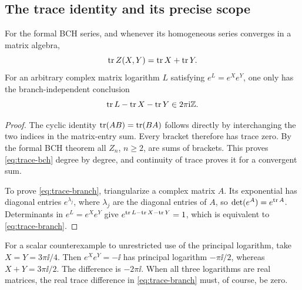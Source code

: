 \subsection{The trace identity and its precise scope}
\begin{proposition}\label{prop:trace}
For the formal BCH series, and whenever its homogeneous series converges in a matrix algebra,
\begin{equation}\label{eq:trace-bch}
 \operatorname{tr} Z(X,Y)=\operatorname{tr} X+\operatorname{tr} Y.
\end{equation}
For an arbitrary complex matrix logarithm $L$ satisfying $e^L=e^Xe^Y$, one only has the branch-independent conclusion
\begin{equation}\label{eq:trace-branch}
 \operatorname{tr} L-\operatorname{tr} X-\operatorname{tr} Y\in2\pi\mathrm i\mathbb Z.
\end{equation}
\end{proposition}
\begin{proof}
The cyclic identity $\operatorname{tr}(AB)=\operatorname{tr}(BA)$ follows directly by interchanging the two indices in the matrix-entry sum. Every bracket therefore has trace zero. By the formal BCH theorem all $Z_n$, $n\geq2$, are sums of brackets. This proves \cref{eq:trace-bch} degree by degree, and continuity of trace proves it for a convergent sum.

To prove \cref{eq:trace-branch}, triangularize a complex matrix $A$. Its exponential has diagonal entries $e^{\lambda_j}$, where $\lambda_j$ are the diagonal entries of $A$, so $\det(e^A)=e^{\operatorname{tr} A}$. Determinants in $e^L=e^Xe^Y$ give
$e^{\operatorname{tr} L-\operatorname{tr} X-\operatorname{tr} Y}=1$, which is equivalent to \cref{eq:trace-branch}.
\end{proof}
For a scalar counterexample to unrestricted use of the principal logarithm, take
$X=Y=3\pi\ii/4$. Then $e^Xe^Y=-\ii$ has principal logarithm $-\pi\ii/2$, whereas $X+Y=3\pi\ii/2$. The difference is $-2\pi\ii$. When all three logarithms are real matrices, the real trace difference in \cref{eq:trace-branch} must, of course, be zero.

